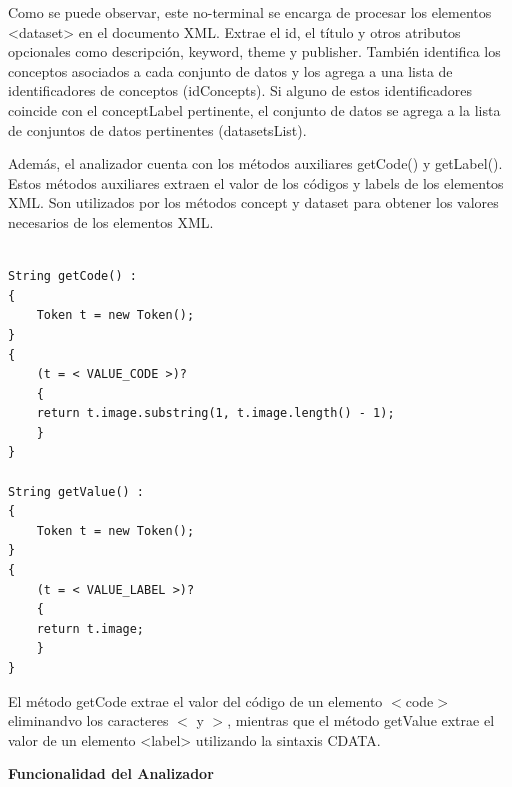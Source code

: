 Como se puede observar, este no-terminal se encarga de procesar los elementos <dataset> en el documento XML. Extrae el id, el título y otros atributos opcionales como descripción, keyword, theme y publisher. También identifica los conceptos asociados a cada conjunto de datos y los agrega a una lista de identificadores de conceptos (idConcepts). Si alguno de estos identificadores coincide con el conceptLabel pertinente, el conjunto de datos se agrega a la lista de conjuntos de datos pertinentes (datasetsList).

Además, el analizador cuenta con los métodos auxiliares getCode()  y getLabel(). Estos métodos auxiliares extraen el valor de los códigos y labels de los elementos XML. Son utilizados por los métodos concept y dataset para obtener los valores necesarios de los elementos XML.

\lstset{inputencoding=utf8/latin1}
\begin{lstlisting}

String getCode() :
{
    Token t = new Token();
}
{
    (t = < VALUE_CODE >)?
    {
    return t.image.substring(1, t.image.length() - 1);
    }
}

String getValue() :
{
    Token t = new Token();
}
{
    (t = < VALUE_LABEL >)?
    {
    return t.image;
    }
}  

\end{lstlisting}

El método getCode extrae el valor del código de un elemento $<$code$>$ eliminandvo los caracteres $<$ y $>$, mientras que el método getValue extrae el valor de un elemento <label> utilizando la sintaxis CDATA.

\phantom{text}

\noindent \textbf{Funcionalidad del Analizador}

\phantom{text}



